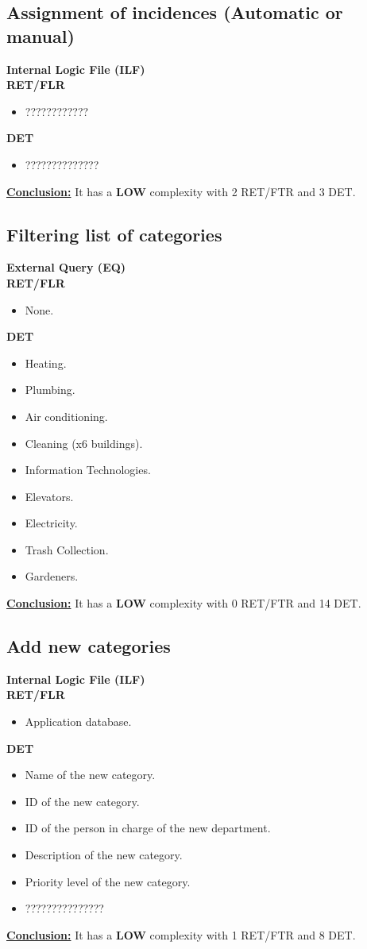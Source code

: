 \subsection{Assignment of incidences (Automatic or manual)}
\textbf{Internal Logic File (ILF)} \\ 
\textbf{RET/FLR}
\begin{itemize}
\item ????????????
\end{itemize}
\textbf{DET}
\begin{itemize}
\item ??????????????
\end{itemize}
\textbf{\underline{Conclusion:}} It has a \textbf{LOW} complexity with 2 RET/FTR and 3 DET.

\subsection{Filtering list of categories}
\textbf{External Query (EQ)} \\ 
\textbf{RET/FLR}
\begin{itemize}
\item None.
\end{itemize}
\textbf{DET}
\begin{itemize}
\item Heating.
\item Plumbing.
\item Air conditioning.
\item Cleaning (x6 buildings).
\item Information Technologies.
\item Elevators.
\item Electricity.
\item Trash Collection.
\item Gardeners.
\end{itemize}
\textbf{\underline{Conclusion:}} It has a \textbf{LOW} complexity with 0 RET/FTR and 14 DET.

\subsection{Add new categories}
\textbf{Internal Logic File (ILF)} \\ 
\textbf{RET/FLR}
\begin{itemize}
\item Application database.
\end{itemize}
\textbf{DET}
\begin{itemize}
\item Name of the new category.
\item ID of the new category.
\item ID of the person in charge of the new department.
\item Description of the new category.
\item Priority level of the new category.
\item ???????????????
\end{itemize}
\textbf{\underline{Conclusion:}} It has a \textbf{LOW} complexity with 1 RET/FTR and 8 DET.

